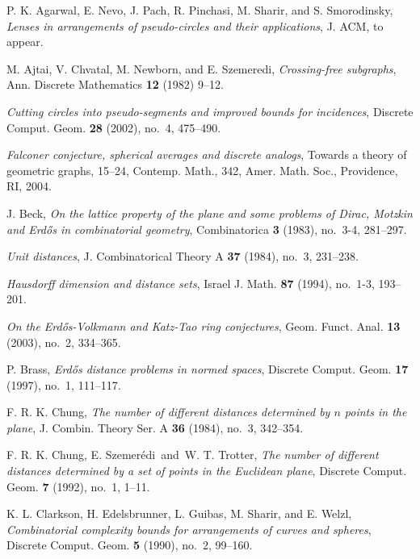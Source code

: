 \documentclass[]{amsart}
\numberwithin{equation}{section}
\theoremstyle{plain}
\theoremstyle{definition}
\theoremstyle{remark}
\begin{document}
\begin{thebibliography}{55}

 P. K. Agarwal, E. Nevo, J. Pach,
R. Pinchasi, M. Sharir, and S. Smorodinsky,
{\it Lenses in arrangements of pseudo-circles
and their applications}, J. ACM, to appear.

 M. Ajtai, V. Chvatal, M. Newborn,
and E. Szemeredi, {\it Crossing-free subgraphs},
Ann. Discrete Mathematics {\bf 12} (1982) 9--12.

{\it Cutting circles into pseudo-segments and
improved bounds for incidences}, Discrete Comput.
Geom. {\bf 28} (2002), no.~4, 475--490.

{\it Falconer conjecture, spherical averages and
discrete analogs}, Towards a theory of geometric
graphs, 15--24, Contemp. Math., 342, Amer. Math.
Soc., Providence, RI, 2004.

 J. Beck, {\it On the lattice property
of the plane and some problems of Dirac, Motzkin and
Erd\H{o}s in combinatorial geometry}, Combinatorica
{\bf 3} (1983), no.~3-4, 281--297.

{\it Unit distances}, J. Combinatorical Theory
A {\bf 37} (1984), no.~3, 231--238.

{\it Hausdorff dimension and distance sets}, Israel J. Math.
{\bf
87} (1994), no.~1-3, 193--201.

{\it On the Erd\H{o}s-Volkmann and Katz-Tao ring conjectures},
Geom. Funct. Anal. {\bf 13} (2003), no.~2, 334--365.

 P. Brass, {\it Erd\H{o}s distance
problems in normed spaces}, Discrete Comput. Geom.
{\bf 17} (1997), no.~1, 111--117.

F. R. K. Chung, {\it The number of
different distances determined by $n$ points
in the plane}, J. Combin. Theory Ser. A {\bf 36}
(1984), no.~3, 342--354.


 F. R. K. Chung, E. Szemer\'edi\ and\
W. T. Trotter, {\it The number of different distances
determined by a set of points in the Euclidean plane},
Discrete Comput. Geom. {\bf 7} (1992), no.~1, 1--11.

 K. L. Clarkson, H. Edelsbrunner, L. Guibas,
M. Sharir, and E. Welzl, {\it Combinatorial complexity
bounds for arrangements of curves and spheres}, Discrete
Comput. Geom.
{\bf 5} (1990), no.~2, 99--160.


\end{thebibliography}
\end{document}
